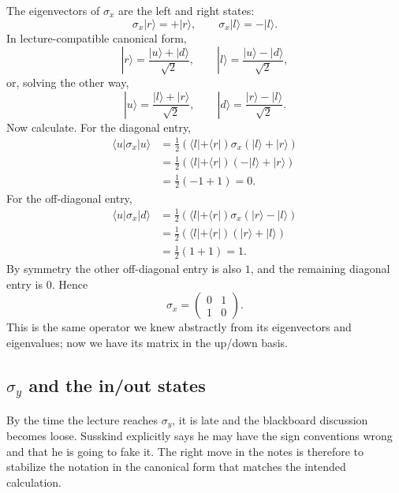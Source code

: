 The eigenvectors of \(\sigma_x\) are the left and right states:
\begin{equation}
\sigma_x|r\rangle=+|r\rangle,
\qquad
\sigma_x|l\rangle=-|l\rangle.
\end{equation}
In lecture-compatible canonical form,
\begin{equation}
|r\rangle=\frac{|u\rangle+|d\rangle}{\sqrt2},
\qquad
|l\rangle=\frac{|u\rangle-|d\rangle}{\sqrt2},
\end{equation}
or, solving the other way,
\begin{equation}
|u\rangle=\frac{|l\rangle+|r\rangle}{\sqrt2},
\qquad
|d\rangle=\frac{|r\rangle-|l\rangle}{\sqrt2}.
\end{equation}
Now calculate. For the diagonal entry,
\begin{align}
\langle u|\sigma_x|u\rangle
  &= \frac{1}{2}(\langle l|+\langle r|)\sigma_x(|l\rangle+|r\rangle) \\
  &= \frac{1}{2}(\langle l|+\langle r|)(-|l\rangle+|r\rangle) \\
  &= \frac{1}{2}(-1+1)=0.
\end{align}
For the off-diagonal entry,
\begin{align}
\langle u|\sigma_x|d\rangle
  &= \frac{1}{2}(\langle l|+\langle r|)\sigma_x(|r\rangle-|l\rangle) \\
  &= \frac{1}{2}(\langle l|+\langle r|)(|r\rangle+|l\rangle) \\
  &= \frac{1}{2}(1+1)=1.
\end{align}
By symmetry the other off-diagonal entry is also \(1\), and the remaining diagonal entry is \(0\). Hence
\begin{equation}
\sigma_x=
\begin{pmatrix}
0 & 1 \\
1 & 0
\end{pmatrix}.
\end{equation}
This is the same operator we knew abstractly from its eigenvectors and eigenvalues; now we have its matrix in the up/down basis.

\subsection{\texorpdfstring{\(\sigma_y\)}{sigma y} and the in/out states}

By the time the lecture reaches \(\sigma_y\), it is late and the blackboard discussion becomes loose. Susskind explicitly says he may have the sign conventions wrong and that he is going to fake it. The right move in the notes is therefore to stabilize the notation in the canonical form that matches the intended calculation.

